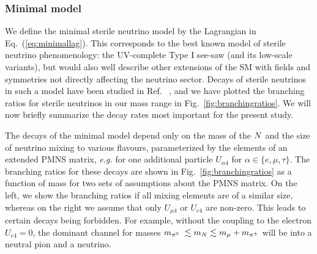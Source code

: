 \documentclass[11pt, a4paper]{article}
\newcommand{\refeq}[1]{Eq.~(\ref{#1})}
\newcommand{\reffig}[1]{Fig.~\ref{#1}}
\newcommand{\refref}[1]{Ref.~\cite{#1}}
\def\ster{\ensuremath N}
\begin{document}
%
%
%
%
\subsubsection{\label{sec:minimal}Minimal model}

We define the minimal sterile neutrino model by the Lagrangian in
\refeq{eq:minimallag}. This corresponds to the best known model of sterile
neutrino phenomenology: the UV-complete Type I see-saw (and its low-scale
variants), but would also well describe other extensions of the SM with fields
and symmetries not directly affecting the neutrino sector. Decays of sterile
neutrinos in such a model have been studied in \refref{Atre:2009rg, PhysRevD.24.1232, PhysRevD.24.1275}
, and we have plotted the branching ratios for sterile
neutrinos in our mass range in \reffig{fig:branchingratios}. We will now
briefly summarize the decay rates most important for the present study.

The decays of the minimal model depend only on the mass of the $\ster$ and the
size of neutrino mixing to various flavours, parameterized by the elements of
an extended PMNS matrix, \emph{e.g.} for one additional particle 
%
$U_{\alpha 4}$ for $\alpha \in \{e,\mu,\tau\}$. 
%
The branching ratios for these decays are shown in \reffig{fig:branchingratios}
as a function of mass for two sets of assumptions about the PMNS matrix. On the
left, we show the branching ratios if all mixing elements are of a similar
size, whereas on the right we assume that only $U_{\mu4}$ or $U_{e4}$ are
non-zero. This leads to certain decays being forbidden. For example, without
the coupling to the electron $U_{e4}=0$, the dominant channel for masses
$m_{\pi^0}~\lesssim m_\ster \lesssim m_{\mu}+m_{\pi^\pm}$ will be into a
neutral pion and a neutrino.
\end{document}
